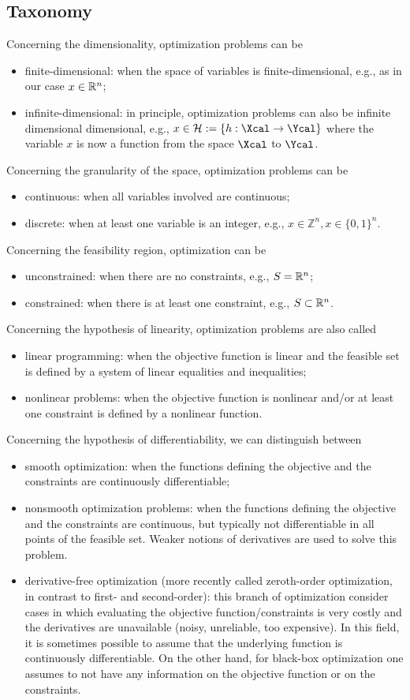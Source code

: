 \documentclass[10pt,a4paper]{article}
\begin{document}
\subsection{Taxonomy}
Concerning the dimensionality, optimization problems can be 
\begin{itemize}
	\item finite-dimensional: when the space of variables is finite-dimensional, e.g., as in our case $x\in\mathbb{R}^n$;
	\item infinite-dimensional: in principle, optimization problems can also be infinite dimensional  dimensional, e.g., $x\in \mathcal{H}:=\{h:\Xcal\to \Ycal\}$ where the variable $x$ is now a function from the space $\Xcal$ to $\Ycal$.
\end{itemize}
Concerning the granularity of the space, optimization problems can be 
\begin{itemize}
	\item continuous: when all variables involved are continuous;
	\item discrete: when at least one variable is an integer, e.g., $x\in \mathbb{Z}^n, x\in \{0,1\}^n.$
\end{itemize}
Concerning the feasibility region, optimization can be 
\begin{itemize}
\item unconstrained: when there are no constraints, e.g., $S=\mathbb{R}^n$;
\item constrained: when there is at least one constraint, e.g., $S\subset\mathbb{R}^n$.
\end{itemize}
Concerning the hypothesis of linearity, optimization problems are also called
\begin{itemize}
\item linear programming: when the objective function is linear and the
feasible set is defined by a system of linear equalities and inequalities;
\item nonlinear problems: when the objective function is nonlinear
and/or at least one constraint is defined by a nonlinear function.
\end{itemize}
Concerning the hypothesis of differentiability, we can distinguish between
\begin{itemize}
\item smooth optimization: when the functions defining the objective
and the constraints are continuously differentiable;
\item nonsmooth optimization problems: when the functions defining the objective and the constraints are continuous, but typically not differentiable in all points of the feasible set. Weaker notions of derivatives are used to solve this problem.
\item derivative-free optimization (more recently called zeroth-order optimization, in contrast to first- and second-order): this branch of optimization consider cases in which evaluating the objective function/constraints is very costly and the derivatives are unavailable (noisy, unreliable, too expensive). In this field, it is sometimes possible to assume that the underlying function is continuously differentiable. On the other hand, for black-box optimization one assumes to not have any information on the objective function or on the constraints.
\end{itemize}
\end{document}
